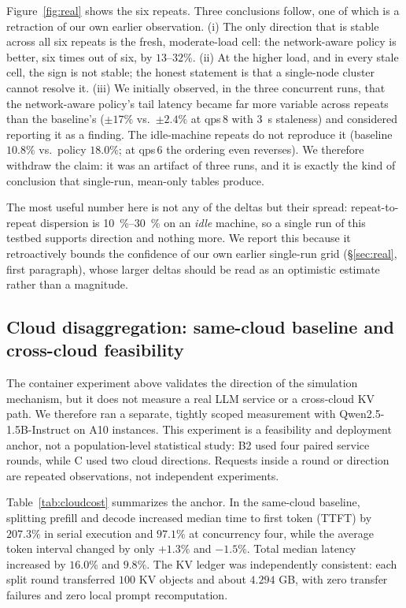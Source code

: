 Figure~\ref{fig:real} shows the six repeats. Three conclusions follow, one of which is a retraction of our own earlier observation.
(i) The only direction that is stable across all six repeats is the fresh, moderate-load cell:
the network-aware policy is better, six times out of six, by $13$--$32\%$.
(ii) At the higher load, and in every stale cell, the sign is not stable; the honest statement is
that a single-node cluster cannot resolve it.
(iii) We initially observed, in the three concurrent runs, that the network-aware policy's tail
latency became far more variable across repeats than the baseline's ($\pm17\%$ vs.\ $\pm2.4\%$ at
qps\,8 with \SI{3}{\second} staleness) and considered reporting it as a finding. The idle-machine
repeats do not reproduce it (baseline $10.8\%$ vs.\ policy $18.0\%$; at qps\,6 the ordering even
reverses). We therefore withdraw the claim: it was an artifact of three runs, and it is exactly
the kind of conclusion that single-run, mean-only tables produce.

The most useful number here is not any of the deltas but their spread: repeat-to-repeat
dispersion is \SIrange{10}{30}{\percent} on an \emph{idle} machine, so a single run of this
testbed supports direction and nothing more. We report this because it retroactively bounds the
confidence of our own earlier single-run grid (\S\ref{sec:real}, first paragraph), whose larger
deltas should be read as an optimistic estimate rather than a magnitude.

\subsection{Cloud disaggregation: same-cloud baseline and cross-cloud feasibility}
\label{sec:real:cloud}

The container experiment above validates the direction of the simulation mechanism, but it does
not measure a real LLM service or a cross-cloud KV path. We therefore ran a separate, tightly
scoped measurement with Qwen2.5-1.5B-Instruct on A10 instances. This experiment is a feasibility
and deployment anchor, not a population-level statistical study: B2 used four paired service
rounds, while C used two cloud directions. Requests inside a round or direction are repeated
observations, not independent experiments.

Table~\ref{tab:cloudcost} summarizes the anchor. In the same-cloud baseline, splitting prefill
and decode increased median time to first token (TTFT) by $207.3\%$ in serial execution and
$97.1\%$ at concurrency four, while the average token interval changed by only $+1.3\%$ and
$-1.5\%$. Total median latency increased by $16.0\%$ and $9.8\%$. The KV ledger was
independently consistent: each split round transferred $100$ KV objects and about $4.294$ GB,
with zero transfer failures and zero local prompt recomputation.

